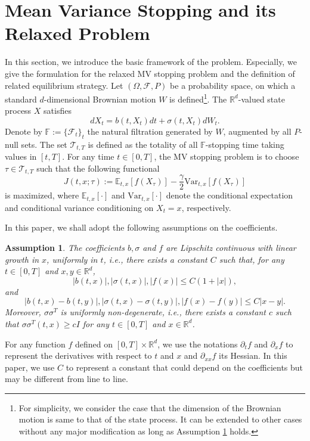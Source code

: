 \documentclass[11pt]{article}
\newtheorem{assumption}{Assumption}[section]
\begin{document}
\section{Mean Variance Stopping  and its Relaxed Problem}
In this section, we  introduce the basic framework of the problem. Especially,  we give the formulation for the relaxed MV stopping problem and the definition of related equilibrium strategy.  
Let $(\Omega,\mathcal F,P)$ be a probability space, on which a standard $d$-dimensional Brownian motion $W$ is defined\footnote{For simplicity, we consider the case that the dimension of the Brownian motion is same to that of the state process. It can be extended to other cases without any major modification as long as Assumption \ref{ass} holds.}. The $\mathbb R^d$-valued state process $X$ satisfies
$$
dX_t=b(t,X_t)dt+\sigma(t,X_t)dW_t.
$$
Denote by $\mathbb F:=\{\mathcal F_t\}_t$ the natural filtration generated by $W$, augmented by all $P$-null sets. The set $\mathcal T_{t,T}$ is defined as the totality of all $\mathbb F$-stopping time taking values in $[t,T]$. For any time $t \in[0,T]$, the  MV stopping problem is to choose $\tau \in \mathcal T_{t,T}$ such that the following  functional 
$$
J(t,x;\tau):=\mathbb E_{t,x}\left[f(X_\tau)\right]-\frac{\gamma}{2}\text{Var}_{t,x}\left[f(X_\tau)\right]
$$
is maximized, where $\mathbb E_{t,x}[\cdot]$ and $\text{Var}_{t,x}[\cdot]$ denote the conditional expectation and conditional variance conditioning on $X_t=x$, respectively.

In this paper, we shall adopt the following assumptions on the coefficients.
\begin{assumption}\label{ass}
The coefficients $b,\sigma$ and $f$ are   Lipschitz continuous  with linear growth  in  $x$, uniformly in $t$, i.e., there exists a constant $C$ such that, for any $t\in [0,T]$ and $x,y \in \mathbb R^d$, 
$$
|b(t,x)|,|\sigma(t,x)|,|f(x)| \le C(1+|x|),
$$
and
$$
|b(t,x)-b(t,y)|,|\sigma(t,x)-\sigma(t,y)|,  |f(x)-f(y)| \le C|x-y|.
$$
Moreover, $\sigma\sigma^T$ is uniformly non-degenerate, i.e., there exists a constant $c$ such that $\sigma\sigma^T(t,x) \ge cI$ for any $t\in [0,T]$ and $x \in \mathbb R^d$.  

\end{assumption}

For any function $f$ defined on $[0,T]\times \mathbb R^d$, we use the notations $\partial_t f$  and $\partial_x f$  to represent the derivatives with respect to $t$ and $x$ and $\partial_{xx} f$ its Hessian.  In this paper, we use $C$ to represent a constant  that could depend on the coefficients but  may be different from line to line.
\end{document}
